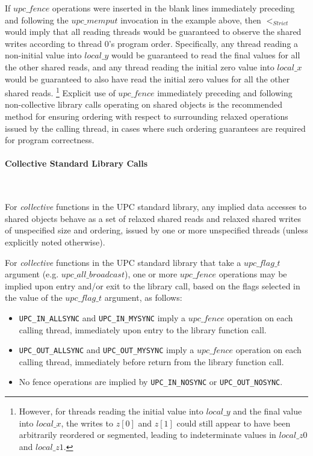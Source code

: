 \documentclass[12pt,titlepage]{article}
\newcounter{parnum}
\newcommand\np{\addtocounter{parnum}{1}\hspace{-2em}\makebox[2em][l]{\arabic{parnum}}}
\begin{document}
\np If $upc\_fence$ operations were inserted in the blank lines immediately
preceding and following the $upc\_memput$ invocation in the example above, then
$<_{Strict}$ would imply that all reading threads would be guaranteed to observe
the shared writes according to thread 0's program order.  Specifically, any
thread reading a non-initial value into $local\_y$ would be guaranteed to read
the final values for all the other shared reads, and any thread reading the
initial zero value into $local\_x$ would be guaranteed to also have read the
initial zero values for all the other shared reads.%
\footnote{However, for threads reading the initial value into $local\_y$ and
the final value into $local\_x$, the writes to $z[0]$ and $z[1]$ could still
appear to have been arbitrarily reordered or segmented, leading to
indeterminate values in $local\_z0$ and $local\_z1$.}
Explicit use of $upc\_fence$ immediately preceding and following non-collective
library calls operating on shared objects is the recommended method for
ensuring ordering with respect to surrounding relaxed operations issued by the
calling thread, in cases where such ordering guarantees are required
for program correctness.

\paragraph{Collective Standard Library Calls}\ \\

\np For {\it collective} functions in the UPC standard library, any implied data
accesses to shared objects behave as a set of relaxed shared reads and relaxed
shared writes of unspecified size and ordering, issued by one or more
unspecified threads (unless explicitly noted otherwise).

\np For {\it collective} functions in the UPC standard library
that take a $upc\_flag\_t$
argument (e.g. $upc\_all\_broadcast$), one or more $upc\_fence$ operations
may be implied upon entry and/or exit to the library call, 
based on the flags selected in the value of the $upc\_flag\_t$ argument, as follows:

\begin{itemize}
\item
{\tt UPC\_IN\_ALLSYNC} and {\tt UPC\_IN\_MYSYNC} imply a $upc\_fence$ operation on 
each calling thread, immediately upon entry to the library function call.

\item
{\tt UPC\_OUT\_ALLSYNC} and {\tt UPC\_OUT\_MYSYNC} imply a $upc\_fence$ operation on 
each calling thread, immediately before return from the library function call.

\item 
No fence operations are implied by {\tt UPC\_IN\_NOSYNC} or {\tt UPC\_OUT\_NOSYNC}.
\end{itemize}
\end{document}
